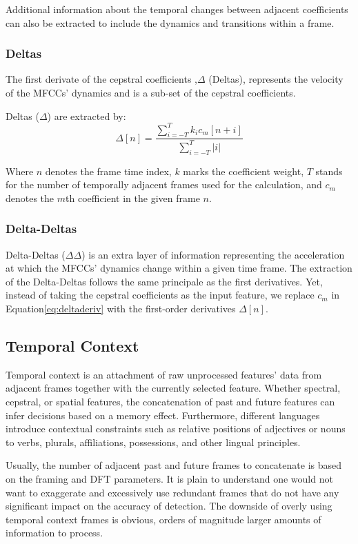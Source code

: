Additional information about the temporal 
changes between adjacent coefficients can also be extracted
to include the dynamics and transitions within a frame.

\subsubsection{Deltas}
The first derivate of the cepstral coefficients
,\(\Delta\) (Deltas),
represents the velocity of the MFCCs' dynamics and 
is a sub-set of the cepstral coefficients.

Deltas (\(\Delta\)) are extracted by:
\begin{equation}\label{eq:deltaderiv}
    \Delta [n] = \frac{ \sum\limits_{i=-T}^{T} k_{i} c_{m}[n+i]}
    {\sum\limits_{i=-T}^{T} |i|}
\end{equation}

Where \(n\) denotes the frame time index, \(k\) marks the 
coefficient weight, \(T\) stands for the number of temporally
adjacent frames used for the calculation, and \(c_{m}\) denotes the
\(m\)th coefficient in the given frame \(n\).

\subsubsection{Delta-Deltas}
Delta-Deltas (\(\Delta\Delta\)) is an extra layer of information
representing the acceleration at which the 
MFCCs' dynamics change within a given time frame.
The extraction of the Delta-Deltas follows the same principale
as the first derivatives. Yet, instead of taking the
cepstral coefficients as the input feature, we replace
\(c_{m}\) in Equation\;\ref{eq:deltaderiv} 
with the first-order derivatives \(\Delta[n]\).

\subsection{Temporal Context}
Temporal context is an attachment of raw unprocessed 
features' data from adjacent
frames together with the currently selected feature. 
Whether spectral, cepstral, or spatial features,
the concatenation of past and future 
features can infer decisions based on a memory effect.
Furthermore, different languages
introduce contextual constraints such as relative positions
of adjectives or nouns to verbs, plurals, affiliations,
possessions, and other lingual principles.

Usually, the number of adjacent past and future frames 
to concatenate is based on the framing and DFT parameters.
It is plain to understand 
one would not want to exaggerate and excessively use
redundant frames that do not have any significant impact
on the accuracy of detection. 
The downside of overly using temporal context frames is obvious, 
orders of magnitude larger amounts of information to process.


